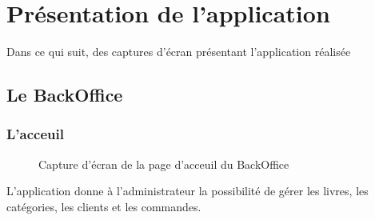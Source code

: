 \section{Présentation de l'application}
Dans ce qui suit, des captures d’écran présentant l’application réalisée
\subsection{Le BackOffice}
\subsubsection{L'acceuil}
\begin{figure}[H]
    \centering
    \caption{Capture d'écran de la page d'acceuil du BackOffice}
\end{figure}
L'application donne à l'administrateur la possibilité de gérer les livres, les catégories, les clients et les commandes.
